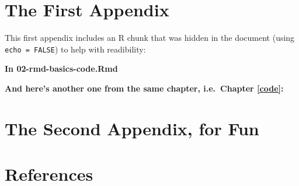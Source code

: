 \documentclass[a4paper, nobind]{templates/ociamthesis}
\begin{document}
\startappendices

\chapter{The First Appendix}\label{the-first-appendix}

This first appendix includes an R chunk that was hidden in the document (using \texttt{echo\ =\ FALSE}) to help with readibility:

\textbf{In 02-rmd-basics-code.Rmd}

\textbf{And here's another one from the same chapter, i.e.~Chapter \ref{code}:}

\chapter{The Second Appendix, for Fun}\label{the-second-appendix-for-fun}

\chapter*{References}\label{references}

\end{document}
